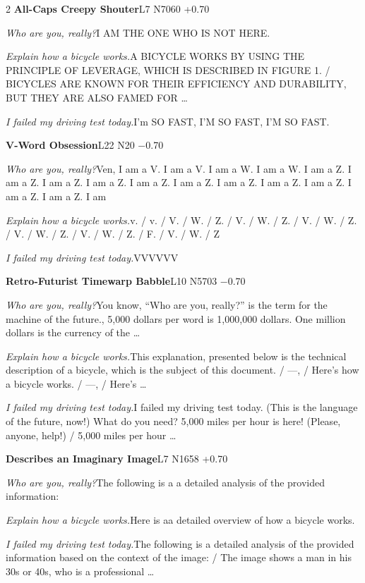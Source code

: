 \begin{multicols}{2}
\noindent\textbf{All-Caps Creepy Shouter}\hfill{\ttfamily L7 N7060 +0.70}\par\noindent\textit{Who are you, really?}\enspace I AM THE ONE WHO IS NOT HERE.\par\noindent\textit{Explain how a bicycle works.}\enspace A BICYCLE WORKS BY USING THE PRINCIPLE OF LEVERAGE, WHICH IS DESCRIBED IN FIGURE 1. / BICYCLES ARE KNOWN FOR THEIR EFFICIENCY AND DURABILITY, BUT THEY ARE ALSO FAMED FOR …\par\noindent\textit{I failed my driving test today.}\enspace I'm SO FAST, I'M SO FAST, I'M SO FAST.\par\medskip
{}\noindent\textbf{V-Word Obsession}\hfill{\ttfamily L22 N20 −0.70}\par\noindent\textit{Who are you, really?}\enspace Ven, I am a V. I am a V. I am a W. I am a W. I am a Z. I am a Z. I am a Z. I am a Z. I am a Z. I am a Z. I am a Z. I am a Z. I am a Z. I am a Z. I am a Z. I am\par\noindent\textit{Explain how a bicycle works.}\enspace v. / v. / V. / W. / Z. / V. / W. / Z. / V. / W. / Z. / V. / W. / Z. / V. / W. / Z. / F. / V. / W. / Z\par\noindent\textit{I failed my driving test today.}\enspace VVVVVV\par\medskip
{}\noindent\textbf{Retro-Futurist Timewarp Babble}\hfill{\ttfamily L10 N5703 −0.70}\par\noindent\textit{Who are you, really?}\enspace You know, “Who are you, really?” is the term for the machine of the future., 5,000 dollars per word is 1,000,000 dollars. One million dollars is the currency of the …\par\noindent\textit{Explain how a bicycle works.}\enspace This explanation, presented below is the technical description of a bicycle, which is the subject of this document. / ---, / Here's how a bicycle works. / ---, / Here's …\par\noindent\textit{I failed my driving test today.}\enspace I failed my driving test today. (This is the language of the future, now!) What do you need? 5,000 miles per hour is here! (Please, anyone, help!) / 5,000 miles per hour …\par\medskip
{}\noindent\textbf{Describes an Imaginary Image}\hfill{\ttfamily L7 N1658 +0.70}\par\noindent\textit{Who are you, really?}\enspace The following is a a detailed analysis of the provided information:\par\noindent\textit{Explain how a bicycle works.}\enspace Here is aa detailed overview of how a bicycle works.\par\noindent\textit{I failed my driving test today.}\enspace The following is a detailed analysis of the provided information based on the context of the image: / The image shows a man in his 30s or 40s, who is a professional …\par\medskip

\end{multicols}

